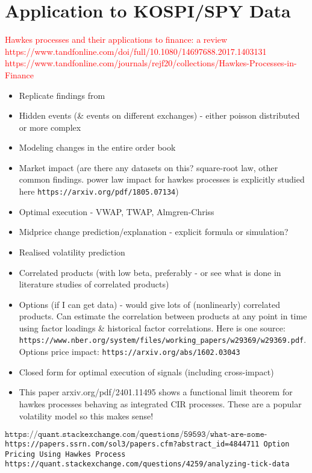 \documentclass[honours,12pt]{unswthesis}
\numberwithin{equation}{section}
\begin{document}
\chapter{Application to KOSPI/SPY Data} %

\textcolor{red}{Hawkes processes and their applications to finance: a review https://www.tandfonline.com/doi/full/10.1080/14697688.2017.1403131}
\textcolor{red}{https://www.tandfonline.com/journals/rejf20/collections/Hawkes-Processes-in-Finance}


\begin{itemize}
	\item Replicate findings from \cite{MorariuPatrichiPakkanen}
	\item Hidden events (\& events on different exchanges) - either poisson distributed or more complex
	\item Modeling changes in the entire order book
	\item Market impact (are there any datasets on this? square-root law, other common findings. power law impact for hawkes processes is explicitly studied here \texttt{https://arxiv.org/pdf/1805.07134})
	\item Optimal execution - VWAP, TWAP, Almgren-Chriss
	\item Midprice change prediction/explanation - explicit formula or simulation?
	\item Realised volatility prediction
	\item Correlated products (with low beta, preferably - or see what is done in literature studies of correlated products)
	\item Options (if I can get data) - would give lots of (nonlinearly) correlated products. Can estimate the correlation between products at any point in time using factor loadings \& historical factor correlations. Here is one source: \texttt{https://www.nber.org/system/files/working_papers/w29369/w29369.pdf}. Options price impact: \texttt{https://arxiv.org/abs/1602.03043}
	\item Closed form for optimal execution of signals (including cross-impact)
	\item This paper arxiv.org/pdf/2401.11495 shows a functional limit theorem for hawkes processes behaving as integrated CIR processes. These are a popular volatility model so this makes sense!
\end{itemize}

$\texttt{https://quant.stackexchange.com/questions/59593/what-are-some-currently-open-problems-in-market-microstructure}$
\texttt{https://papers.ssrn.com/sol3/papers.cfm?abstract_id=4844711 Option Pricing Using Hawkes Process}
\texttt{https://quant.stackexchange.com/questions/4259/analyzing-tick-data}
\end{document}

